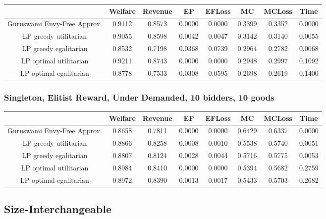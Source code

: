 \begin{tabular}{|c|c|c|c|c|c|c|c|}\hline
                            	&Welfare	&Revenue	&EF	&EFLoss	&MC	&MCLoss	&Time	\\\hline
   Guruswami Envy-Free Approx.	&0.9112	&0.8573	&0.0000	&0.0000	&0.3399	&0.3352	&0.0000	\\\hline 
         LP greedy utilitarian	&0.9055	&0.8598	&0.0042	&0.0047	&0.3142	&0.3140	&0.0055	\\\hline 
         LP greedy egalitarian	&0.8532	&0.7198	&0.0368	&0.0739	&0.2964	&0.2782	&0.0068	\\\hline 
        LP optimal utilitarian	&0.9211	&0.8743	&0.0000	&0.0000	&0.2948	&0.2997	&0.1092	\\\hline 
        LP optimal egalitarian	&0.8778	&0.7533	&0.0308	&0.0595	&0.2698	&0.2619	&0.1400	\\\hline 
\end{tabular}\subsubsection*{Singleton, Elitist Reward, Under Demanded, 10 bidders, 10 goods} 
\begin{tabular}{|c|c|c|c|c|c|c|c|}\hline
                            	&Welfare	&Revenue	&EF	&EFLoss	&MC	&MCLoss	&Time	\\\hline
   Guruswami Envy-Free Approx.	&0.8658	&0.7811	&0.0000	&0.0000	&0.6429	&0.6337	&0.0000	\\\hline 
         LP greedy utilitarian	&0.8866	&0.8258	&0.0008	&0.0010	&0.5538	&0.5740	&0.0051	\\\hline 
         LP greedy egalitarian	&0.8807	&0.8124	&0.0028	&0.0044	&0.5716	&0.5775	&0.0053	\\\hline 
        LP optimal utilitarian	&0.8984	&0.8410	&0.0000	&0.0000	&0.5394	&0.5682	&0.2759	\\\hline 
        LP optimal egalitarian	&0.8972	&0.8390	&0.0013	&0.0017	&0.5433	&0.5703	&0.2682	\\\hline 
\end{tabular}\newpage
\subsection{Size-Interchangeable}
